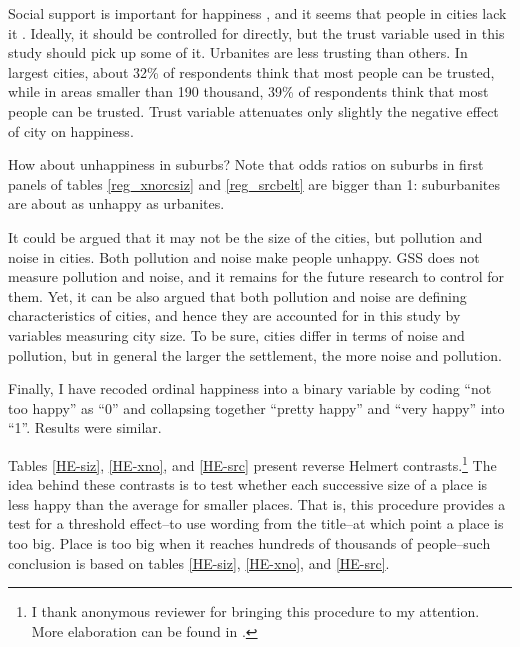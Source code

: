 \documentclass[12pt, letterpaper]{article}
\begin{document}
\begin{spacing}{1.9}
  
Social support is important for
happiness \citep{diener12}, and it seems that people in cities lack it
\citep{wirth38}. Ideally,  it should be controlled for 
directly, but the trust variable used in this study should pick up some of it.
Urbanites are less trusting than others. In largest cities, about 32\% of
respondents think that most people can be trusted, while in areas smaller than
190 thousand, 39\% of respondents think that most people can be trusted.
%
Trust variable attenuates only slightly the negative effect of city on happiness. 

How about unhappiness in suburbs?
 Note that  odds ratios on suburbs in first panels of tables \ref{reg_xnorcsiz}
 and \ref{reg_srcbelt} are bigger than 1: suburbanites are about as unhappy as
 urbanites.  

It could be argued that it may not be the size of the cities, but pollution and noise
in cities. Both pollution \citep{mackerron09} and noise \citep{weinhold12}  make
people unhappy. GSS does not measure pollution and noise, and it remains for the future
research to control for them. Yet, it can be also argued that both pollution and
noise are defining characteristics of cities, and hence they are accounted for
in this study by variables measuring city size. To be sure, cities differ in
terms of noise and pollution, but in general the larger the settlement, the more
noise and pollution.

Finally, I have recoded ordinal happiness into a binary
variable by coding  ``not too happy'' as ``0'' and collapsing together
``pretty happy'' and ``very happy'' into ``1''. Results were similar. %



Tables \ref{HE-siz}, \ref{HE-xno}, and \ref{HE-src} present reverse Helmert
contrasts.\footnote{I thank anonymous reviewer for bringing this procedure to my
attention. More elaboration can be found in \citet[][p. 187]{mitchell12}.} The idea behind these contrasts is to test whether each successive
 size of a place is less happy than the average for smaller places. That is,
 this procedure provides a test for a threshold effect--to use wording from the
 title--at which point a place is too big. Place is too big when it reaches
 hundreds of thousands of people--such conclusion is based on   tables \ref{HE-siz},  \ref{HE-xno}, and \ref{HE-src}.


\end{spacing}
\end{document}
